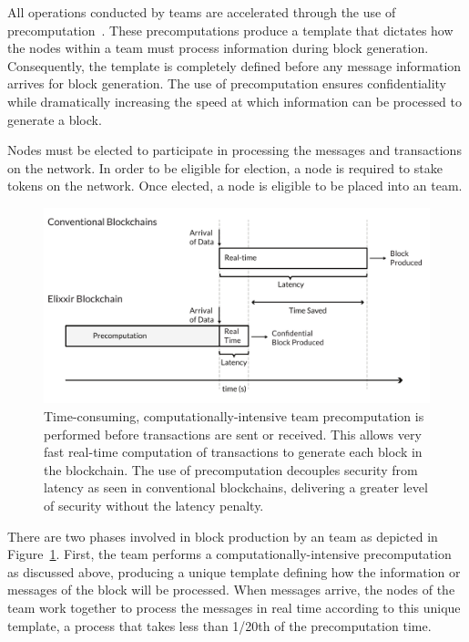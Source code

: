 All operations conducted by \name teams are accelerated through the use of precomputation~\cite{precomps}. These precomputations produce a template that dictates how the nodes within a team must process information during block generation. Consequently, the template is completely defined before any message information arrives for block generation. The use of precomputation ensures confidentiality while dramatically increasing the speed at which information can be processed to generate a block.

Nodes must be elected to participate in processing the messages and transactions on the \name network. In order to be eligible for election, a node is required to stake tokens on the network. Once elected, a node is eligible to be placed into an \name team. 

\begin{figure}[H]
    \centering
    \includegraphics[width=\textwidth]{img/Processing.pdf}
    \caption{Time-consuming, computationally-intensive team precomputation is performed before transactions are sent or received. This allows very fast real-time computation of transactions to generate each block in the blockchain. The use of precomputation decouples security from latency as seen in conventional blockchains, delivering a greater level of security without the latency penalty.}
    \label{figure:processing}
\end{figure}

There are two phases involved in block production by an \name team as depicted in Figure~\ref{figure:processing}. First, the team performs a computationally-intensive precomputation as discussed above, producing a unique template defining how the information or messages of the block will be processed. When messages arrive, the nodes of the team work together to process the messages in real time according to this unique template, a process that takes less than 1/20th of the precomputation time. 

